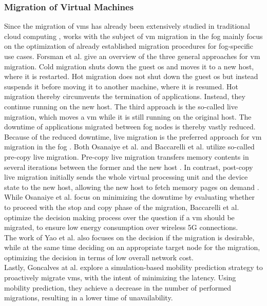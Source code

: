 \subsubsection{Migration of Virtual Machines}
\label{lMigrationVM}
Since the migration of \gls{vm}s has already been extensively studied in traditional cloud computing \cite{Yao.2015}, works with the subject of \gls{vm} migration in the fog mainly focus on the optimization of already established migration procedures for fog-specific use cases. Forsman et al. \cite{Forsman.2015} give an overview of the three general approaches for \gls{vm} migration. Cold migration shuts down the guest \gls{os} and moves it to a new host, where it is restarted. Hot migration does not shut down the guest \gls{os} but instead suspends it before moving it to another machine, where it is resumed. Hot migration thereby circumvents the termination of applications. Instead, they continue running on the new host. The third approach is the so-called live migration, which moves a \gls{vm} while it is still running on the original host. The downtime of applications migrated between fog nodes is thereby vastly reduced. Because of the reduced downtime, live migration is the preferred approach for \gls{vm} migration in the fog \cite{Baccarelli.2018, Osanaiye.2017}. Both Osanaiye et al. \cite{Osanaiye.2017} and Baccarelli et al. \cite{Baccarelli.2018} utilize so-called pre-copy live migration. Pre-copy live migration transfers memory contents in several iterations between the former and the new host \cite{Osanaiye.2017}. In contrast, post-copy live migration initially sends the whole virtual processing unit and the device state to the new host, allowing the new host to fetch memory pages on demand \cite{Osanaiye.2017}. While Osanaiye et al. \cite{Osanaiye.2017} focus on minimizing the downtime by evaluating whether to proceed with the stop and copy phase of the migration, Baccarelli et al. \cite{Baccarelli.2018} optimize the decision making process over the question if a \gls{vm} should be migrated, to ensure low energy consumption over wireless 5G connections.\\
The work of Yao et al. \cite{Yao.2015} also focuses on the decision if the migration is desirable, while at the same time deciding on an appropriate target node for the migration, optimizing the decision in terms of low overall network cost.\\
Lastly, Goncalves at al. \cite{Goncalves.2018} explore a simulation-based mobility prediction strategy to proactively migrate \gls{vm}s, with the intent of minimizing the latency. Using mobility prediction, they achieve a decrease in the number of performed migrations, resulting in a lower time of unavailability.


